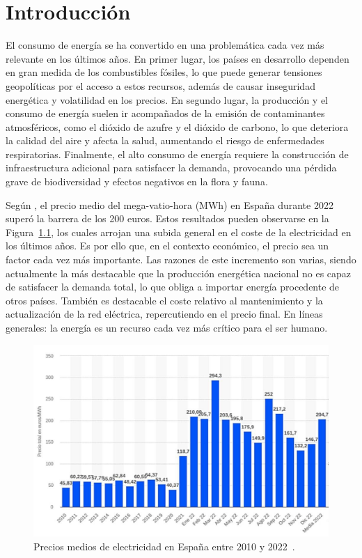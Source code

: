 \chapter{Introducción}
\label{cap:Introduccion}

El consumo de energía se ha convertido en una problemática cada vez más relevante en los últimos años. En primer lugar, los países en desarrollo dependen en gran medida de los combustibles fósiles, lo que puede generar tensiones geopolíticas por el acceso a estos recursos, además de causar inseguridad energética y volatilidad en los precios. En segundo lugar, la producción y el consumo de energía suelen ir acompañados de la emisión de contaminantes atmosféricos, como el dióxido de azufre y el dióxido de carbono, lo que deteriora la calidad del aire y afecta la salud, aumentando el riesgo de enfermedades respiratorias. Finalmente, el alto consumo de energía requiere la construcción de infraestructura adicional para satisfacer la demanda, provocando una pérdida grave de biodiversidad y efectos negativos en la flora y fauna.

Según \cite{electricidadEspana},  el precio medio del mega-vatio-hora (MWh) en España durante 2022 superó la barrera de los 200 euros. Estos resultados pueden observarse en la Figura~\ref{fig:precioMedioLuz}, los cuales arrojan una subida general en el coste de la electricidad en los últimos años. Es por ello que, en el contexto económico, el precio sea un factor cada vez más importante. Las razones de este incremento son varias, siendo actualmente la más destacable que la producción energética nacional no es capaz de satisfacer la demanda total, lo que obliga a importar energía procedente de otros países. También es destacable el coste relativo al mantenimiento y la actualización de la red eléctrica, repercutiendo en el precio final. En líneas generales: la energía es un recurso cada vez más crítico para el ser humano. 

\begin{figure}[H]
    \centering
    \includegraphics[width=0.85\linewidth, height=0.45\textwidth]{figs/electricidadStatista.jpg}
    \caption{Precios medios de electricidad en España entre 2010 y 2022~\cite{electricidadEspana}.}
    \label{fig:precioMedioLuz}
\end{figure}

